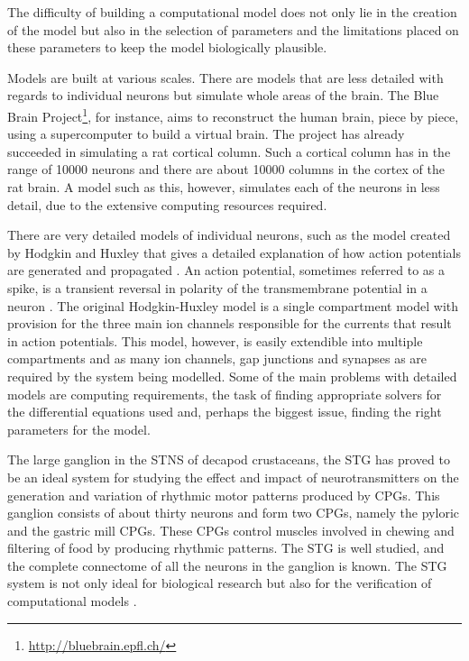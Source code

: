The difficulty of building a computational model does not only lie in the creation of the model but also in the selection of parameters and the limitations placed on these parameters to keep the model biologically plausible.

Models are built at various scales. There are models that are less detailed with regards to individual neurons but simulate whole areas of the brain. The Blue Brain Project\footnote{\url{http://bluebrain.epfl.ch/}}, for instance, aims to reconstruct the human brain, piece by piece, using a supercomputer to build a virtual brain. The project has already succeeded in simulating a rat cortical column. Such a cortical column has in the range of 10000 neurons and there are about 10000 columns in the cortex of the rat brain. A model such as this, however, simulates each of the neurons in less detail, due to the extensive computing resources required.

There are very detailed models of individual neurons, such as the model created by Hodgkin and Huxley that gives a detailed explanation of how  action potentials are generated and propagated \cite{Hodgkin1952a}. An action potential, sometimes referred to as a spike, is a transient reversal in polarity of the transmembrane potential in a neuron \cite{Barnett2007}. The original Hodgkin-Huxley model is a single compartment model with provision for the three main ion channels responsible for the currents that result in action potentials. This model, however, is easily extendible into multiple compartments and as many ion channels, gap junctions and synapses as are required by the system being modelled. Some of the main problems with detailed models  are computing requirements, the task of finding appropriate solvers for the differential equations used and, perhaps the biggest issue, finding the right parameters for the model.%

The large ganglion in the \ac{STNS} of decapod crustaceans, the \ac{STG} has proved to be an ideal system for studying the effect and impact of neurotransmitters on the generation and variation of rhythmic motor patterns produced by \acp{CPG}. This ganglion consists of about thirty neurons and form two \acp{CPG}, namely the pyloric and the gastric mill \acp{CPG}. These \acp{CPG} control muscles involved in chewing and filtering of food by producing rhythmic patterns. The \ac{STG} is well studied, and the complete connectome of all the neurons in the ganglion is known. The \ac{STG} system is not only ideal for biological research but also for the verification of computational models \cite{Harris-Warrick1992, Selverston2008}. 

